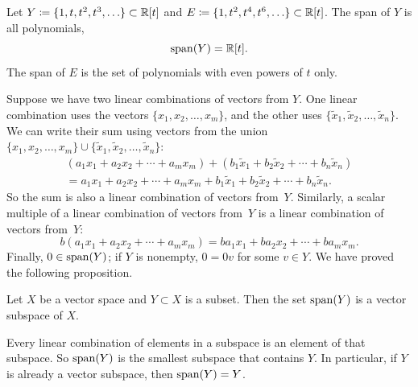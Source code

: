 \begin{example}
Let $Y \coloneqq \{ 1, t, t^2, t^3, \ldots \} \subset {\mathbb{R}}[t]$ and
$E \coloneqq \{ 1, t^2, t^4, t^6, \ldots \} \subset {\mathbb{R}}[t]$.
The span of $Y$ is all polynomials,
\begin{equation*}
\operatorname{span}(Y) = {\mathbb{R}}[t] .
\end{equation*}
The span of $E$ is the set of polynomials with even powers of $t$ only.
\end{example}

Suppose we have two linear combinations of vectors from $Y$.  One linear
combination uses the vectors $\{ x_1,x_2,\ldots,x_m \}$, and the other uses
$\{ \widetilde{x}_1,\widetilde{x}_2,\ldots,\widetilde{x}_n \}$.  We can write
their sum using vectors from the union
$\{ x_1,x_2,\ldots,x_m \} \cup
\{ \widetilde{x}_1,\widetilde{x}_2,\ldots,\widetilde{x}_n \}$:
\begin{multline*}
(a_1 x_1 + 
a_2 x_2 +  \cdots
+ a_m x_m)
+
(b_1 \widetilde{x}_1 + 
b_2 \widetilde{x}_2 +  \cdots
+ b_n \widetilde{x}_n)
\\
=
a_1 x_1 + 
a_2 x_2 +  \cdots
+ a_m x_m
+
b_1 \widetilde{x}_1 + 
b_2 \widetilde{x}_2 +  \cdots
+ b_n \widetilde{x}_n .
\end{multline*}
So the sum is also a linear combination of vectors from~$Y$.
Similarly,
a scalar multiple of a linear combination of vectors from~$Y$
is a linear combination of vectors from~$Y$:
\begin{equation*}
b (a_1 x_1 + 
a_2 x_2 +  \cdots
+ a_m x_m)
=
b a_1  x_1 + 
b a_2 x_2 +  \cdots
+ b a_m x_m .
\end{equation*}
Finally, $0 \in \operatorname{span}(Y)$; if $Y$ is nonempty, $0 = 0 v$ for some $v \in Y$.
We have proved the following proposition.

\begin{prop}
Let $X$ be a vector space and $Y \subset X$ is a subset.
Then the set $\operatorname{span}(Y)$ is a vector subspace of $X$.
\end{prop}

Every linear combination of elements in a subspace is an element of that
subspace.  So $\operatorname{span}(Y)$ is the smallest subspace that contains $Y$.
In particular,
if $Y$ is already a vector subspace, then $\operatorname{span}(Y) = Y$.

